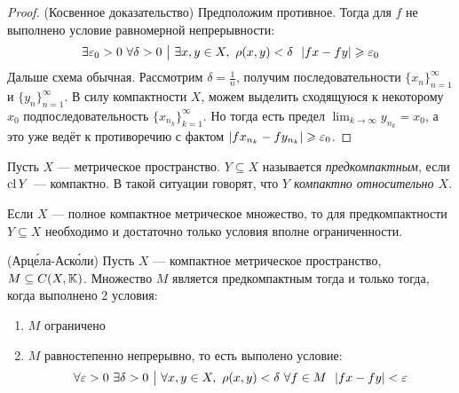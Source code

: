 \begin{proof} (Косвенное доказательство)
	Предположим противное. Тогда для $f$ не выполнено условие равномерной непрерывности:
	\[
		\exists \varepsilon_0 > 0\ \forall \delta > 0 \ \big|\  \exists x, y \in X,\ \rho(x, y) < \delta\ \ |fx - fy| \geqslant \varepsilon_0
	\]
	Дальше схема обычная. Рассмотрим $\delta = \frac{1}{n}$, получим последовательности $\{x_n\}_{n = 1}^\infty$ и $\{y_n\}_{n = 1}^\infty$. В силу компактности $X$, можем выделить сходящуюся к некоторому $x_0$ подпоследовательность $\{x_{n_k}\}_{k = 1}^\infty$. Но тогда есть предел $\lim_{k \to \infty} y_{n_k} = x_0$, а это уже ведёт к противоречию с фактом $|fx_{n_k} - fy_{n_k}| \geqslant \varepsilon_0$.
\end{proof}

\begin{definition}
	Пусть $X$ --- метрическое пространство. $Y \subseteq X$ называется \textit{предкомпактным}, если $\operatorname{cl} Y$ --- компактно. В такой ситуации говорят, что \textit{$Y$ компактно относительно $X$}.
\end{definition}

\begin{exercise}
	Если $X$ --- полное компактное метрическое множество, то для предкомпактности $Y \subseteq X$ необходимо и достаточно только условия вполне ограниченности.
\end{exercise}

\begin{theorem} (Арц\'{е}ла-Аск\'{о}ли)
	Пусть $X$ --- компактное метрическое пространство, $M \subseteq C(X, \mathbb{K})$. Множество $M$ является предкомпактным тогда и только тогда, когда выполнено 2 условия:
	\begin{enumerate}
		\item $M$ ограничено
		
		\item $M$ равностепенно непрерывно, то есть выполено условие:
		\[
			\forall \varepsilon > 0\ \exists \delta >0 \ \big|\  \forall x, y \in X,\ \rho(x, y) < \delta\ \forall f \in M\ \ |fx - fy| < \varepsilon
		\] 
	\end{enumerate}
\end{theorem}

